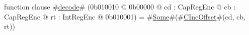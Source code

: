 function clause #\hyperref[zdecode]{decode}# (0b010010 @ 0b00000 @ cd : CapRegEnc @ cb : CapRegEnc @ rt : IntRegEnc @ 0b010001) = #\hyperref[zSome]{Some}#(#\hyperref[zCIncOffset]{CIncOffset}#(cd, cb, rt))
